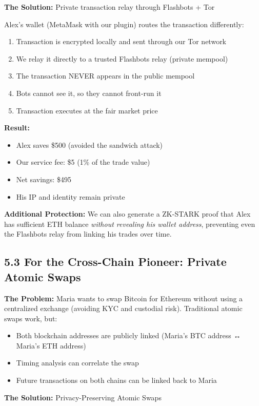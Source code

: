 \documentclass[11pt,a4paper]{article}
\begin{document}
\textbf{The Solution:} Private transaction relay through Flashbots + Tor

Alex's wallet (MetaMask with our plugin) routes the transaction differently:
\begin{enumerate}
    \item Transaction is encrypted locally and sent through our Tor network
    \item We relay it directly to a trusted Flashbots relay (private mempool)
    \item The transaction NEVER appears in the public mempool
    \item Bots cannot see it, so they cannot front-run it
    \item Transaction executes at the fair market price
\end{enumerate}

\textbf{Result:}
\begin{itemize}
    \item Alex saves \$500 (avoided the sandwich attack)
    \item Our service fee: \$5 (1\% of the trade value)
    \item Net savings: \$495
    \item His IP and identity remain private
\end{itemize}

\textbf{Additional Protection:} We can also generate a ZK-STARK proof that Alex has sufficient ETH balance \textit{without revealing his wallet address}, preventing even the Flashbots relay from linking his trades over time.

\subsection{5.3 For the Cross-Chain Pioneer: Private Atomic Swaps}

\textbf{The Problem:} Maria wants to swap Bitcoin for Ethereum without using a centralized exchange (avoiding KYC and custodial risk). Traditional atomic swaps work, but:
\begin{itemize}
    \item Both blockchain addresses are publicly linked (Maria's BTC address ↔ Maria's ETH address)
    \item Timing analysis can correlate the swap
    \item Future transactions on both chains can be linked back to Maria
\end{itemize}

\textbf{The Solution:} Privacy-Preserving Atomic Swaps
\end{document}
